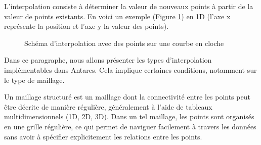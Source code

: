 L'interpolation consiste à déterminer la valeur de nouveaux points à partir de la valeur de points existants. En voici un exemple (Figure \ref{fig:interpolation_cloche_points}) en \ac{1D} (l'axe x représente la position et l'axe y la valeur des points).

\vspace{0,5cm}


\begin{figure}[H]
    \centering
    \caption{Schéma d'interpolation avec des points sur une courbe en cloche}
    \label{fig:interpolation_cloche_points}
\end{figure}

Dans ce paragraphe, nous allons présenter les types d'interpolation\cite{cassiopee2015} implémentables dans Antares.
Cela implique certaines conditions, notamment sur le type de maillage.

Un maillage structuré est un maillage dont la connectivité\label{connectivité} entre les points peut être décrite de manière régulière, généralement à l'aide de tableaux multidimensionnels (1D, 2D, 3D). Dans un tel maillage, les points sont organisés en une grille régulière, ce qui permet de naviguer facilement à travers les données sans avoir à spécifier explicitement les relations entre les points.

